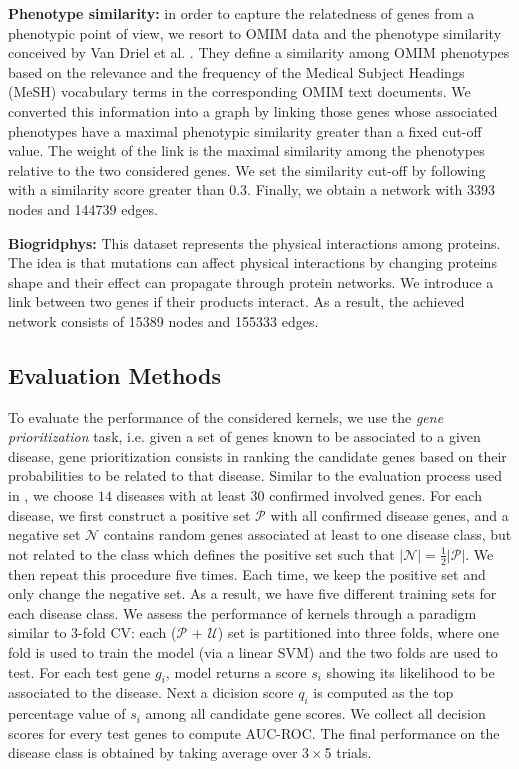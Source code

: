 \documentclass[runningheads,a4paper]{llncs}
\begin{document}
\textbf{Phenotype similarity:} in order to capture the relatedness of genes from a phenotypic point of view, we resort to OMIM \cite{jour4} data and the phenotype similarity conceived by Van Driel et al. \cite{jour5}. They define a similarity among OMIM phenotypes based on the relevance and the frequency of the Medical Subject Headings (MeSH) vocabulary terms in the corresponding OMIM text documents. We converted this information into a graph by linking those genes whose associated phenotypes have a maximal phenotypic similarity greater than a fixed cut-off value. The weight of the link is the maximal similarity among the phenotypes relative to the two considered genes. We set the similarity cut-off by following \cite{jour5} with a similarity score greater than $0.3$. Finally, we obtain a network with 3393 nodes and 144739 edges.

\textbf{Biogridphys:} This dataset represents the physical interactions among proteins. The idea is that mutations can affect physical interactions by changing proteins shape and their effect can propagate through protein networks. We introduce a link between two genes if their products interact. As a result, the achieved network consists of 15389 nodes and 155333 edges.

\subsection{Evaluation Methods}
To evaluate the performance of the considered kernels, we use the {\em gene prioritization} task, i.e. given a set of genes known to be associated to a given disease, gene prioritization consists in ranking the candidate genes based on their probabilities to be related to that disease. Similar to the evaluation process used in \cite{proceeding3}, we choose $14$ diseases with at least $30$ confirmed involved genes. For each disease, we first construct a positive set $\mathcal{P}$ with all confirmed disease genes, and a negative set $\mathcal{N}$ contains random genes associated at least to one disease class, but not related to the class which defines the positive set such that $\vert \mathcal{N} \vert = \frac{1}{2} \vert \mathcal{P} \vert$. We then repeat this procedure five times. Each time, we keep the positive set and only change the negative set. As a result, we have five different training sets for each disease class. We assess the performance of kernels through a paradigm similar to 3-fold CV: each ($\mathcal{P}$ + $\mathcal{U}$) set is partitioned into three folds, where one fold is used to train the model (via a linear SVM) and the two folds are used to test. For each test gene $g_i$, model returns a score $s_i$ showing its likelihood to be associated to the disease. Next a dicision score $q_i$ is computed as the top percentage value of $s_i$ among all candidate gene scores. We collect all decision scores for every test genes to compute AUC-ROC. The final performance on the disease class is obtained by taking average over $3\times$5 trials.
\end{document}
